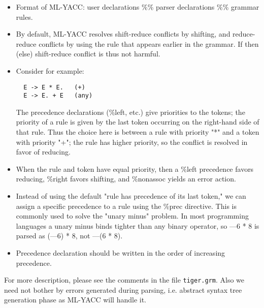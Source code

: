 \begin{itemize}
  \item Format of ML-YACC: user declarations \%\% parser declarations \%\% grammar rules.
  \item By default, ML-YACC resolves shift-reduce conflicts by shifting, and reduce-reduce conflicts by using the rule that appears earlier in the grammar. If then (else) shift-reduce conflict is thus not harmful.
  \item Consider for example: 
  \begin{verbatim}
  E -> E * E.   (+)
  E -> E. + E   (any)
  \end{verbatim}
  The precedence declarations (\%left, etc.) give priorities to the tokens; the priority of a rule is given by the last token occurring on the right-hand side of that rule. Thus the choice here is between a rule with priority "*" and a token with priority "+"; the rule has higher priority, so the conflict is resolved in favor of reducing.
  \item When the rule and token have equal priority, then a \%left precedence favors reducing, \%right favors shifting, and \%nonassoc yields an error action.
  \item Instead of using the default "rule has precedence of its last token," we can assign a specific precedence to a rule using the \%prec directive. This is commonly used to solve the "unary minus" problem. In most programming languages a unary minus binds tighter than any binary operator, so —6 * 8 is parsed as (—6) * 8, not —(6 * 8).
  \item Precedence declaration should be written in the order of increasing precedence. 
\end{itemize}

For more description, please see the comments in the file \texttt{tiger.grm}. Also we need not bother by errors generated during parsing, i.e. abstract syntax tree generation phase as ML-YACC will handle it.